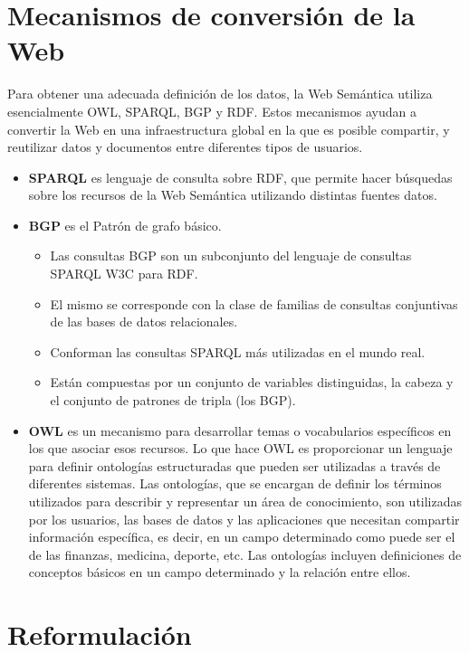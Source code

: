 \documentclass[10pt,a4paper]{article}
\begin{document}
\section{Mecanismos de conversión de la Web}
Para obtener una adecuada definición de los datos, la Web Semántica utiliza esencialmente OWL, SPARQL, BGP y RDF. Estos mecanismos ayudan a convertir la Web en una infraestructura global en la que es posible compartir, y reutilizar datos y documentos entre diferentes tipos de usuarios.
\begin{itemize}
\item \textbf{SPARQL} es lenguaje de consulta sobre RDF, que permite hacer búsquedas sobre los recursos de la Web Semántica utilizando distintas fuentes datos.
\item \textbf{BGP} es el Patrón de grafo básico.
\begin{itemize}
\item Las consultas BGP son un subconjunto del lenguaje de consultas SPARQL W3C para RDF. 
\item El mismo se corresponde con la clase de familias de consultas conjuntivas de las bases de datos relacionales. 
\item Conforman las consultas SPARQL más utilizadas en el mundo real.
\item Están compuestas por un conjunto de variables distinguidas, la cabeza y el conjunto de patrones de tripla (los BGP).
\end{itemize}

\item \textbf{OWL} es un mecanismo para desarrollar temas o vocabularios específicos en los que asociar esos recursos. Lo que hace OWL es proporcionar un lenguaje para definir ontologías estructuradas que pueden ser utilizadas a través de diferentes sistemas. Las ontologías, que se encargan de definir los términos utilizados para describir y representar un área de conocimiento, son utilizadas por los usuarios, las bases de datos y las aplicaciones que necesitan compartir información específica, es decir, en un campo determinado como puede ser el de las finanzas, medicina, deporte, etc. Las ontologías incluyen definiciones de conceptos básicos en un campo determinado y la relación entre ellos.
\end{itemize}

\section{Reformulación}
\end{document}

